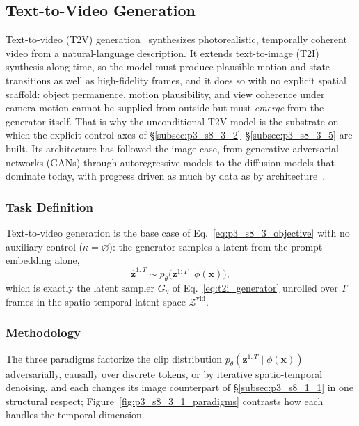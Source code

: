 \subsection{Text-to-Video Generation}
\label{subsec:p3_s8_3_1}

Text-to-video (T2V) generation~\cite{sora2024,polyak2024movie,hong2022cogvideo,wan2025wan} synthesizes photorealistic, temporally coherent video from a natural-language description.
It extends text-to-image (T2I) synthesis along time, so the model must produce plausible motion and state transitions as well as high-fidelity frames, and it does so with no explicit spatial scaffold: object permanence, motion plausibility, and view coherence under camera motion cannot be supplied from outside but must \emph{emerge} from the generator itself.
That is why the unconditional T2V model is the substrate on which the explicit control axes of §\ref{subsec:p3_s8_3_2}--§\ref{subsec:p3_s8_3_5} are built.
Its architecture has followed the image case, from generative adversarial networks (GANs) through autoregressive models to the diffusion models that dominate today, with progress driven as much by data as by architecture~\cite{chen2024panda70mcaptioning70mvideos,NEURIPS2024_57f6683e}.

\subsubsection{Task Definition}
\label{subsubsec:p3_s8_3_1_task}
Text-to-video generation is the base case of Eq.~\eqref{eq:p3_s8_3_objective} with no auxiliary control ($\kappa=\varnothing$): the generator samples a latent from the prompt embedding alone,
\begin{equation}
\hat{\mathbf{z}}^{1:T}\sim p_\theta\!\big(\mathbf{z}^{1:T}\,\big|\,\phi(\mathbf{x})\big),
\label{eq:p3_s8_3_1_objective}
\end{equation}
which is exactly the latent sampler $G_\theta$ of Eq.~\eqref{eq:t2i_generator} unrolled over $T$ frames in the spatio-temporal latent space $\mathcal{Z}^{\text{vid}}$.

\subsubsection{Methodology}
\label{subsubsec:p3_s8_3_1_methodology}
The three paradigms factorize the clip distribution $p_\theta(\mathbf{z}^{1:T}\mid\phi(\mathbf{x}))$ adversarially, causally over discrete tokens, or by iterative spatio-temporal denoising, and each changes its image counterpart of §\ref{subsec:p3_s8_1_1} in one structural respect; Figure~\ref{fig:p3_s8_3_1_paradigms} contrasts how each handles the temporal dimension.

